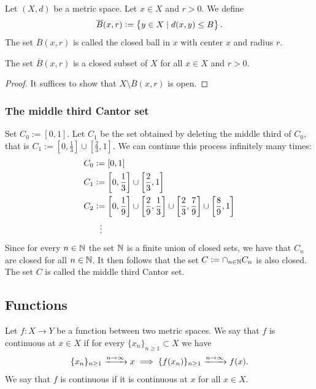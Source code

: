 \documentclass[11pt,a4paper]{article}
\begin{document}
\begin{definition}
  Let $(X,d)$ be a metric space. Let $x \in X$ and $r > 0$.
  We define
  \[
    \overline{B}(x,r) := \left\{y \in X \mid d(x,y) \le B\right\}. 
  \]
  The set $\overline{B}(x,r)$ is called the closed ball in $x$ with center
  $x$ and radius $r$.
\end{definition}
\begin{proposition}
  The set $\overline{B}(x,r)$ is a closed subset of $X$ for all $x \in X$
  and $r > 0$.
\end{proposition}
\begin{proof}
  It suffices to show that $X \setminus \overline B(x,r)$ is open.
\end{proof}

\subsubsection{The middle third Cantor set}

\begin{example}
  Set $C_0 := [0,1]$. Let $C_1$ be the set obtained by deleting the
  middle third of $C_0$, that is 
  $C_1 := \left[0,\frac 13\right] \cup \left[\frac 23,1\right]$.
  We can continue this process infinitely many times:
  \begin{align*}
    &C_0 := \intcc{0,1} \\
    &C_1 := \intcc{0,\frac 13} \cup \intcc{\frac 23,1} \\
    &C_2 := 
    \intcc{0, \frac 19} \cup
    \intcc{\frac 29, \frac 13} \cup
    \intcc{\frac 23, \frac 79} \cup
    \intcc{\frac 89, 1} \\
    &\phantom{C_k} \vdotswithin{:=}
  \end{align*}
  Since for every $n \in \mathbb{N}$ the set $\mathbb{N}$ is a finite union of closed
  sets, we have that $C_n$ are closed for all $n \in \mathbb{N}$. It then
  follows that the set $C := \cap_{n \in \mathbb{N}} C_n$ is also closed.
  The set $C$ is called the middle third Cantor set.
\end{example}

\subsection{Functions}

\begin{definition}[Continuity]
  Let $f \colon X \to Y$ be a function between two metric spaces.
  We say that $f$ is continuous at $x \in X$ if for every
  $\{x_n\}_{n \geq 1} \subset X$ we have
  \[
    \{x_n\}_{n \geq 1} \xrightarrow{n \to \infty} x \implies 
    \{f(x_n)\}_{n \geq 1} \xrightarrow{n \to \infty} f(x).
  \]
  We say that $f$ is continuous if it is continuous at $x$ for all
  $x \in X$.
\end{definition}
\end{document}
